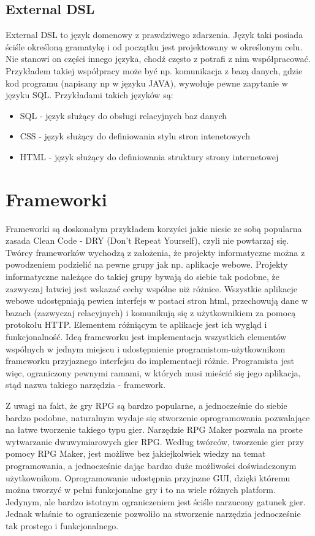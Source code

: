 \documentclass	{xmgr}
\begin{document}
\subsection{External DSL}

External DSL to język domenowy z prawdziwego zdarzenia. Język taki posiada ściśle określoną gramatykę i od początku jest projektowany w określonym celu. Nie stanowi on części innego języka, chodź często z potrafi z nim współpracować. Przykładem takiej współpracy może być np. komunikacja z bazą danych, gdzie kod programu (napisany np w języku JAVA), wywołuje pewne zapytanie w języku SQL. Przykładami takich języków są:
\begin{itemize}
	\item SQL - język służący do obsługi relacyjnych baz danych
	\item CSS - język służący do definiowania stylu stron intenetowych 
	\item HTML - język służący do definiowania struktury strony internetowej
\end{itemize}

\section{Frameworki}

Frameworki są doskonałym przykładem korzyści jakie niesie ze sobą popularna zasada Clean Code \cite{CleanCode:1000} - DRY (Don't Repeat Yourself), czyli nie powtarzaj się. 
Twórcy frameworków  wychodzą z założenia, że projekty informatyczne można z powodzeniem podzielić na pewne grupy jak np. aplikacje webowe. Projekty informatyczne należące do takiej grupy bywają do siebie tak podobne, że zazwyczaj łatwiej jest wskazać cechy wspólne niż różnice.
Wszystkie aplikacje webowe udostępniają pewien interfejs w postaci stron html, przechowują dane w bazach (zazwyczaj relacyjnych) i komunikują się z użytkownikiem za pomocą protokołu HTTP. Elementem różniącym te aplikacje jest ich wygląd i funkcjonalność. Ideą frameworku jest implementacja wszystkich elementów wspólnych w jednym miejscu i udostępnienie programistom-użytkownikom frameworku przyjaznego interfejsu do implementacji różnic. Programista jest więc, ograniczony pewnymi ramami, w których musi mieścić się jego aplikacja, stąd nazwa takiego narzędzia - framework.

Z uwagi na fakt, że gry RPG są bardzo popularne, a jednocześnie do siebie bardzo podobne, naturalnym wydaje się stworzenie oprogramowania pozwalające na łatwe tworzenie takiego typu gier. Narzędzie RPG Maker \cite{RPGMaker:2017:Doc} pozwala na proste wytwarzanie dwuwymiarowych gier RPG. Według twórców, tworzenie gier przy pomocy RPG Maker, jest możliwe bez jakiejkolwiek wiedzy na temat programowania, a jednocześnie dając bardzo duże możliwości doświadczonym użytkownikom. Oprogramowanie udostępnia przyjazne GUI, dzięki któremu można tworzyć w pełni funkcjonalne gry i to na wiele różnych platform. Jedynym, ale bardzo istotnym ograniczeniem jest ściśle narzucony gatunek gier. Jednak właśnie to ograniczenie pozwoliło na stworzenie narzędzia jednocześnie tak prostego i funkcjonalnego. 
\end{document}
